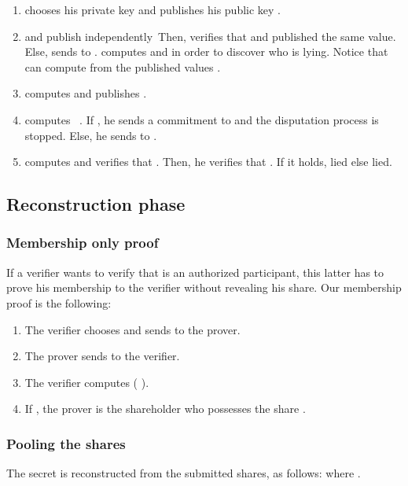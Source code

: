 \documentclass[submission,copyright,creativecommons]{eptcs}
\begin{document}
\begin{enumerate}
\item  chooses his private key  and publishes his public key .

\item  and  publish independently\  Then,  verifies that  and 
published the same value. Else,  sends  to .   computes  and  in order to discover who is lying. Notice that  can compute  from the
published values  .\item  computes and publishes .\ \ \ \ 

\item  computes  \ .
If   , he sends a
commitment to  and the disputation process is stopped. Else, he sends  to .

\item  computes  and verifies that . Then, he verifies that . If it holds, 
 lied else  lied.
\end{enumerate}

\subsection{Reconstruction phase}

\subsubsection{Membership only proof}

If a verifier wants to verify that  is an authorized participant,
this latter has to prove his membership to the verifier without revealing
his share. Our membership proof is the following:

\begin{enumerate}
\item The verifier chooses  and sends  to the prover.

\item The prover sends  to the verifier.

\item The verifier computes  (  ).

\item If , the prover is the shareholder who possesses the
share .
\end{enumerate}

\subsubsection{Pooling the shares}

The secret is reconstructed from the submitted shares, as follows:  where .
\end{document}
